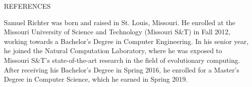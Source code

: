 \documentclass[times,12pt,titlepage]{mstogs}
\begin{document}

\begin{ThesisBibliography}{REFERENCES}

\singlespacing

\end{ThesisBibliography}


\begin{Vita}
Samuel Richter was born and raised in St. Louis, Missouri. He enrolled at the Missouri University of Science and Technology (Missouri S\&T) in Fall 2012, working towards a Bachelor's Degree in Computer Engineering. In his senior year, he joined the Natural Computation Laboratory, where he was exposed to Missouri S\&T's state-of-the-art research in the field of evolutionary computing. After receiving his Bachelor's Degree in Spring 2016, he enrolled for a Master's Degree in Computer Science, which he earned in Spring 2019.
\end{Vita}
\end{document}
